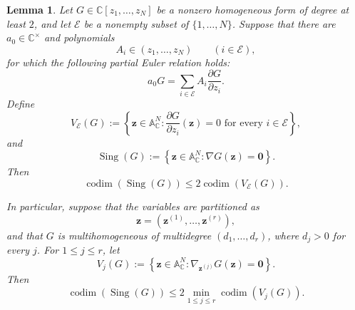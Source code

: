 \documentclass[12pt,reqno]{amsart}
\newtheorem{lemma}[theorem]{Lemma}
\theoremstyle{definition}
\theoremstyle{remark}
\numberwithin{equation}{section}
\newcommand{\codim}[1]{\operatorname{codim}\left(#1\right)}
\newcommand{\Sing}[1]{\operatorname{Sing}\left(#1\right)}
\def\bfz{{\mathbf z}}
\def\C{{\mathbb C}}\def\D{{\mathbb D}}
\def\A{{\mathbb A}}
\begin{document}
\begin{lemma}\label{lemma:codimension comparison}
    Let $G\in\C[z_1,\ldots,z_N]$ be a nonzero homogeneous form of degree at
    least $2$, and let $\mathcal E$ be a nonempty subset of
    $\{1,\ldots,N\}$. Suppose that there are $a_0\in\C^\times$ and
    polynomials
    \[
    A_i\in(z_1,\ldots,z_N)
    \qquad (i\in\mathcal E),
    \]
    for which the following partial Euler relation holds:
    \begin{equation}\label{eq:partial Euler relation}
        a_0G=\sum_{i\in\mathcal E}
        A_i\frac{\partial G}{\partial z_i}.
    \end{equation}
    Define
    \[
    V_{\mathcal E}(G):=
    \left\{\bfz\in\A_{\C}^{N}:
    \frac{\partial G}{\partial z_i}(\bfz)=0
    \text{ for every }i\in\mathcal E\right\},
    \]
    and
    \[
    \Sing{G}:=
    \left\{\bfz\in\A_{\C}^{N}:\nabla G(\bfz)=\mathbf 0\right\}.
    \]
    Then
    \[
    \codim{\Sing{G}}\leq 2\codim{V_{\mathcal E}(G)}.
    \]

    In particular, suppose that the variables are partitioned as
    \[
    \bfz=(\bfz^{(1)},\ldots,\bfz^{(r)}),
    \]
    and that $G$ is multihomogeneous of multidegree
    $(d_1,\ldots,d_r)$, where $d_j>0$ for every $j$. For $1\leq j\leq r$,
    let
    \[
    V_j(G):=
    \left\{\bfz\in\A_{\C}^{N}:
    \nabla_{\bfz^{(j)}}G(\bfz)=\mathbf 0\right\}.
    \]
    Then
    \[
    \codim{\Sing{G}}
    \leq 2\min_{1\leq j\leq r}\codim{V_j(G)}.
    \]
\end{lemma}
\end{document}
